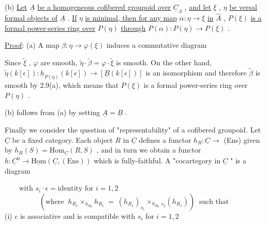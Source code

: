 (b)  \underline{Let} $\underline{A}$ \underline{be a homogeneous cofibered groupoid over} $\underline{C}_{\Lambda}$ , \underline{and let} $\xi$ , $\eta$ \underline{be versal formal objects of} $\underline{A}$ . \underline{If} $\eta$ \underline{is minimal, then for any map} $\alpha : \eta \to \xi$ \underline{in} $\hat{A}$ , $P(\xi)$ \underline{is a formal power-series ring over} $P(\eta)$ \underline{through} $P(\alpha) : P(\eta) \to P(\xi)$ .

\underline{Proof}:  (a)  A map $\beta : \eta \to \varphi(\xi)$ induces a commutative diagram

\begin{center}
\end{center}
Since $\widetilde{\xi}$ , $\varphi$ are smooth, $\widetilde{\eta}\cdot\widetilde{\beta} = \varphi\cdot\widetilde{\xi}$ is smooth. On the other hand,
$\widetilde{\eta}(k[\epsilon]) : \underline{h}_{P(\eta)}(k[\epsilon]) \to [\underline{B}(k[\epsilon])]$ is an isomorphism and therefore $\widetilde{\beta}$ is smooth by 2.9(a), which means that $P(\xi)$ is a formal power-series ring over $P(\eta)$ .

(b)  follows from (a) by setting $\underline{A} = \underline{B}$ .

Finally we consider the question of  "representability"  of a cofibered groupoid. Let $\underline{C}$ be a fixed category. Each object $R$ in $\underline{C}$ defines a functor $h_R : \underline{C} \to$ (Ens)  given by  $h_R(S) = \mathrm{Hom}_{\underline{C}}(R,S)$ , and in turn we obtain a functor $h : \underline{C}^0 \to \underline{\mathrm{Hom}}(\underline{C},(\mathrm{Ens}))$ which is fully-faithful. A  "cocartegory in $\underline{C}$ "  is a diagram

$\qquad\text{with } s_i \cdot \epsilon = \text{identity for } i = 1,2$
\begin{equation*}
(\text{where } \ h_{R_1} \times_{h_{R_0}} h_{R_1} \ = \ (h_{R_1})_{s_1} \times_{h_{R_0}} {}_{s_2}(h_{R_1})) \ \text{ such that}
\end{equation*}
(i)  $c$  is associative and is compatible with  $s_i$  for  $i = 1,2$

